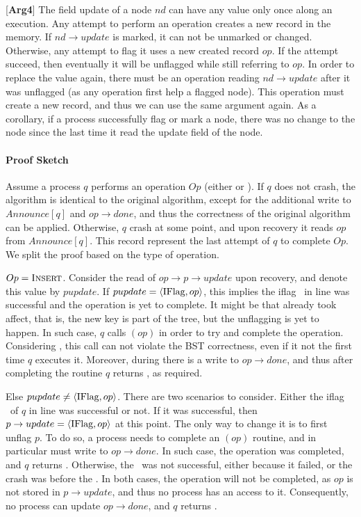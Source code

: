 \newcommand{\argNodeUpdate}{arg4}
[\textbf{Arg4}] The field update of a node $nd$ can have any value only once along an execution. Any attempt to perform an operation creates a new record in the memory. If $nd\rightarrow update$ is marked, it can not be unmarked or changed. Otherwise, any attempt to flag it uses a new created record $op$. If the attempt succeed, then eventually it will be unflagged while still referring to $op$. In order to replace the value again, there must be an operation reading $nd\rightarrow update$ after it was unflagged (as any operation first help a flagged node). This operation must create a new record, and thus we can use the same argument again. As a corollary, if a process successfully flag or mark a node, there was no change to the node since the last time it read the update field of the node.

\paragraph{Proof Sketch}
Assume a process $q$ performs an operation $Op$ (either  or ). If $q$ does not crash, the algorithm is identical to the original algorithm, except for the additional write to $Announce[q]$ and $op\rightarrow done$, and thus the correctness of the original algorithm can be applied. Otherwise, $q$ crash at some point, and upon recovery it reads $op$ from $Announce[q]$. This record represent the last attempt of $q$ to complete $Op$. We split the proof based on the type of operation.

$Op = \mbox{\sc Insert}$. Consider the read of $op\rightarrow p\rightarrow update$ upon recovery, and denote this value by $pupdate$. If $pupdate = \langle \mbox{IFlag}, op \rangle$, this implies the iflag \CASB\ in line  was successful and the operation is yet to complete. It might be that  already took affect, that is, the new key is part of the tree, but the unflagging is yet to happen. In such case, $q$ calls $(op)$ in order to try and complete the operation. Considering \argAnonymous, this call can not violate the BST correctness, even if it not the first time $q$ executes it. Moreover, during  there is a write to $op\rightarrow done$, and thus after completing the routine $q$ returns \TRUE, as required.

Else $pupdate \neq \langle \mbox{IFlag}, op \rangle$. There are two scenarios to consider. Either the iflag \CASB\ of $q$ in line  was successful or not. If it was successful, then $p\rightarrow update = \langle \mbox{IFlag}, op \rangle$ at this point. The only way to change it is to first unflag $p$. To do so, a process needs to complete an $(op)$ routine, and in particular must write to $op\rightarrow done$. In such case, the  operation was completed, and $q$ returns \TRUE. Otherwise, the \CASB\ was not successful, either because it failed, or the crash was before the \CASB. In both cases, the  operation will not be completed, as $op$ is not stored in $p\rightarrow update$, and thus no process has an access to it. Consequently, no process can update $op\rightarrow done$, and $q$ returns \FAIL.

